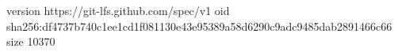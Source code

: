 version https://git-lfs.github.com/spec/v1
oid sha256:df4737b740c1ee1cd1f081130e43e95389a58d6290c9adc9485dab2891466c66
size 10370
